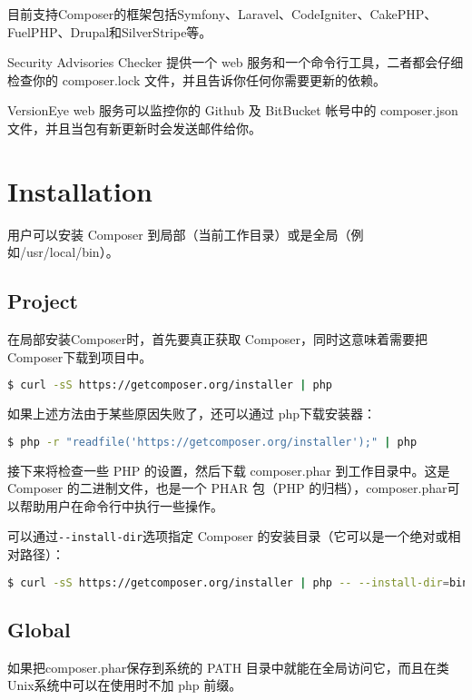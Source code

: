 目前支持Composer的框架包括Symfony、Laravel、CodeIgniter、CakePHP、FuelPHP、Drupal和SilverStripe等。

Security Advisories Checker 提供一个 web 服务和一个命令行工具，二者都会仔细检查你的 composer.lock 文件，并且告诉你任何你需要更新的依赖。

VersionEye web 服务可以监控你的 Github 及 BitBucket 帐号中的 composer.json 文件，并且当包有新更新时会发送邮件给你。



\section{Installation}

用户可以安装 Composer 到局部（当前工作目录）或是全局（例如/usr/local/bin）。

\subsection{Project}

在局部安装Composer时，首先要真正获取 Composer，同时这意味着需要把Composer下载到项目中。

\begin{lstlisting}[language=bash]
$ curl -sS https://getcomposer.org/installer | php
\end{lstlisting}

如果上述方法由于某些原因失败了，还可以通过 php下载安装器：

\begin{lstlisting}[language=bash]
$ php -r "readfile('https://getcomposer.org/installer');" | php
\end{lstlisting}

接下来将检查一些 PHP 的设置，然后下载 composer.phar 到工作目录中。这是 Composer 的二进制文件，也是一个 PHAR 包（PHP 的归档），composer.phar可以帮助用户在命令行中执行一些操作。

可以通过\texttt{-\/-install-dir}选项指定 Composer 的安装目录（它可以是一个绝对或相对路径）：

\begin{lstlisting}[language=bash]
$ curl -sS https://getcomposer.org/installer | php -- --install-dir=bin
\end{lstlisting}

\subsection{Global}

如果把composer.phar保存到系统的 PATH 目录中就能在全局访问它，而且在类Unix系统中可以在使用时不加 php 前缀。

